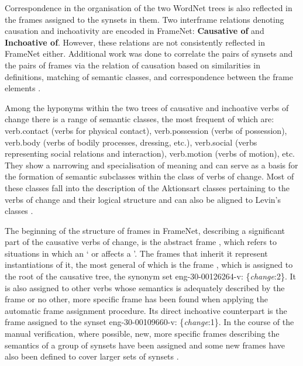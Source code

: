 \documentclass[output=paper,colorlinks,citecolor=brown]{langscibook}
\begin{document}
Correspondence in the organisation of the two WordNet trees is also reflected in the frames assigned to the synsets in them. Two interframe relations denoting causation and inchoativity are encoded in FrameNet: \textbf{Causative of} and \textbf{Inchoative of}. However, these relations are not consistently reflected in FrameNet either. Additional work was done to correlate the pairs of synsets and the pairs of frames via the relation of causation based on similarities in definitions, matching of semantic classes, and correspondence between the frame elements \citep{LesevaStoyanova2021change}.


Among the hyponyms within the two trees of causative and inchoative verbs of change there is a range of semantic classes, the most frequent of which are: verb.contact (verbs for physical contact), verb.possession (verbs of possession), verb.body (verbs of bodily processes, dressing, etc.), verb.social (verbs representing social relations and interaction), verb.motion (verbs of motion), etc. They show a narrowing and specialisation of meaning and can serve as a basis for the formation of semantic subclasses within the class of verbs of change. Most of these classes fall into the description of the Aktionsart classes pertaining to the verbs of change and their logical structure \citep[42--49]{VanValin2005} and can also be aligned to Levin's classes \citep[240--247]{Levin1993}.


The beginning of the structure of frames in FrameNet, describing a significant part of the causative verbs of change, is the abstract frame , which refers to situations in which an ` or  affects a '. The frames that inherit it represent instantiations of it, the most general of which is the frame , which is assigned to the root of the causative tree, the synonym set eng-30-00126264-v: \{\textit{change}:2\}. It is also assigned to other verbs whose semantics is adequately described by the frame or no other, more specific frame has been found when applying the automatic frame assignment procedure. Its direct inchoative counterpart is the frame  assigned to the synset eng-30-00109660-v: \{\textit{change}:1\}. In the course of the manual verification, where possible, new, more specific frames describing the semantics of a group of synsets have been assigned and some new frames have also been defined to cover larger sets of synsets \citep{StoyanovaLeseva2019,LesevaStoyanova2021change}.
\end{document}
